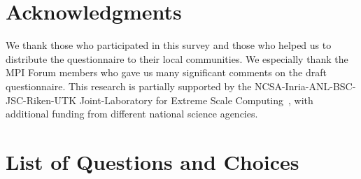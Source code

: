 \documentclass[preprint,5p,times]{elsarticle}
\begin{document}
{\section*{Acknowledgments}

We thank those who participated in this survey and those who helped us to
distribute the questionnaire to their local communities. We especially thank
the MPI Forum members who gave us many significant comments on the draft
questionnaire. This research is partially supported by the
NCSA-Inria-ANL-BSC-JSC-Riken-UTK Joint-Laboratory for Extreme Scale
Computing~\cite{JLESC}, with additional funding from different national science
agencies.




\appendix
\section{List of Questions and Choices}
\label{app:questions}

}
\end{document}

